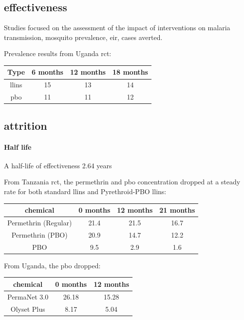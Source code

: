\documentclass[a4paper, 12pt, twoside]{article}
\begin{document}
\subsection{effectiveness}
Studies focused on the assessment of the impact of interventions on malaria transmission, mosquito prevalence, \gls{eir}, cases averted.

Prevalence results from Uganda \gls{rct}\cite{Staedke2020}:
\begin{center}
	\begin{tabular}{c c c c}
		Type        & 6 months & 12 months & 18 months \\
		\hline
		\gls{llins} & 15       & 13        & 14        \\
		\gls{pbo}   & 11       & 11        & 12        \\
	\end{tabular}
\end{center}

\subsection{attrition}

\paragraph{Half life}%
\label{par:half_life}

A half-life of effectiveness 2.64 years

From Tanzania\cite{Protopopoff2018} \gls{rct}, the permethrin and \gls{pbo} concentration dropped at a steady rate for both standard \gls{llins} and Pyrethroid-PBO \gls{llins}:

\begin{center}
	\begin{tabular}{cccc}
		\toprule
		chemical             & 0 months & 12 months & 21 months \\
		\midrule
		Permethrin (Regular) & 21.4     & 21.5      & 16.7      \\
		Permethrin (PBO)     & 20.9     & 14.7      & 12.2      \\
		PBO                  & 9.5      & 2.9       & 1.6       \\
		\bottomrule
	\end{tabular}
\end{center}

From Uganda\cite{Staedke2020}, the \gls{pbo} dropped:
\begin{center}
	\begin{tabular}{c c c}
		\toprule
		chemical     & 0 months & 12 months \\
		\midrule
		PermaNet 3.0 & 26.18    & 15.28     \\
		Olyset Plus  & 8.17     & 5.04      \\
		\bottomrule
	\end{tabular}
\end{center}
\end{document}
